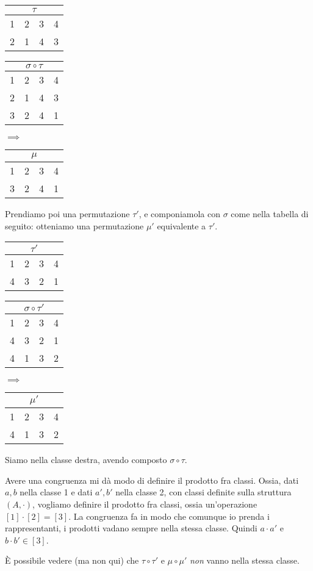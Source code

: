 \begin{exmp}
\begin{center}
\begin{tabular}{cccc}
\multicolumn{4}{c}{$\tau$} \\
\hline
1 & 2 & 3 & 4 \\
2 & 1 & 4 & 3
\end{tabular}
\qquad
\begin{tabular}{cccc}
\multicolumn{4}{c}{$\sigma \circ \tau$} \\
\hline
1 & 2 & 3 & 4 \\
2 & 1 & 4 & 3 \\
3 & 2 & 4 & 1
\end{tabular}
$\implies$
\begin{tabular}{cccc}
\multicolumn{4}{c}{$\mu$} \\
\hline
1 & 2 & 3 & 4 \\
3 & 2 & 4 & 1
\end{tabular}
\end{center}

Prendiamo poi una permutazione $\tau'$, e componiamola con $\sigma$ come nella tabella di seguito: otteniamo una permutazione $\mu'$ equivalente a $\tau'$.

\begin{center}
\begin{tabular}{cccc}
\multicolumn{4}{c}{$\tau'$} \\
\hline
1 & 2 & 3 & 4 \\
4 & 3 & 2 & 1
\end{tabular}
\qquad
\begin{tabular}{cccc}
\multicolumn{4}{c}{$\sigma \circ \tau'$} \\
\hline
1 & 2 & 3 & 4 \\
4 & 3 & 2 & 1 \\
4 & 1 & 3 & 2
\end{tabular}
$\implies$
\begin{tabular}{cccc}
\multicolumn{4}{c}{$\mu'$} \\
\hline
1 & 2 & 3 & 4 \\
4 & 1 & 3 & 2
\end{tabular}
\end{center}

Siamo nella classe destra, avendo composto $\sigma \circ \tau$.

Avere una congruenza mi d\`a modo di definire il prodotto fra classi. Ossia, dati $a, b$ nella classe 1 e dati $a', b'$ nella classe 2, con classi definite sulla struttura $(A, \cdot)$, vogliamo definire il prodotto fra classi, ossia un'operazione $[1] \cdot [2] = [3]$.  La congruenza fa in modo che comunque io prenda i rappresentanti, i prodotti vadano sempre nella stessa classe. Quindi $a \cdot a'$ e $b \cdot b' \in [3]$.

\`E possibile vedere (ma non qui) che $\tau \circ \tau'$ e $\mu \circ \mu'$ \textit{non} vanno nella stessa classe.
\end{exmp}

